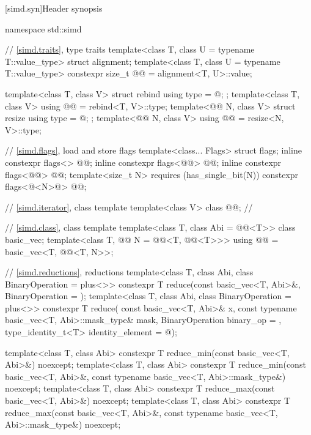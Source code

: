 [simd.syn]{Header  synopsis}
%
\begin{codeblock}
namespace std::simd {
  // \ref{simd.traits}, type traits
  template<class T, class U = typename T::value_type> struct alignment;
  template<class T, class U = typename T::value_type>
    constexpr size_t @@ = alignment<T, U>::value;

  template<class T, class V> struct rebind { using type = @\seebelow@; };
  template<class T, class V> using @@ = rebind<T, V>::type;
  template<@@ N, class V> struct resize { using type = @\seebelow@; };
  template<@@ N, class V> using @@ = resize<N, V>::type;

  // \ref{simd.flags}, load and store flags
  template<class... Flags> struct flags;
  inline constexpr flags<> @@{};
  inline constexpr flags<@@> @@{};
  inline constexpr flags<@@> @@{};
  template<size_t N> requires (has_single_bit(N))
    constexpr flags<@<N>@> @@{};

  // \ref{simd.iterator}, class template 
  template<class V>
    class @@;                // \expos

  // \ref{simd.class}, class template 
  template<class T, class Abi = @@<T>> class basic_vec;
  template<class T, @@ N = @@<T, @@<T>>>
    using @@ = basic_vec<T, @@<T, N>>;

  // \ref{simd.reductions}, reductions
  template<class T, class Abi, class BinaryOperation = plus<>>
    constexpr T reduce(const basic_vec<T, Abi>&, BinaryOperation = {});
  template<class T, class Abi, class BinaryOperation = plus<>>
    constexpr T reduce(
      const basic_vec<T, Abi>& x, const typename basic_vec<T, Abi>::mask_type& mask,
      BinaryOperation binary_op = {}, type_identity_t<T> identity_element = @\seebelow@);

  template<class T, class Abi>
    constexpr T reduce_min(const basic_vec<T, Abi>&) noexcept;
  template<class T, class Abi>
    constexpr T reduce_min(const basic_vec<T, Abi>&,
                           const typename basic_vec<T, Abi>::mask_type&) noexcept;
  template<class T, class Abi>
    constexpr T reduce_max(const basic_vec<T, Abi>&) noexcept;
  template<class T, class Abi>
    constexpr T reduce_max(const basic_vec<T, Abi>&,
                           const typename basic_vec<T, Abi>::mask_type&) noexcept;

}
\end{codeblock}
